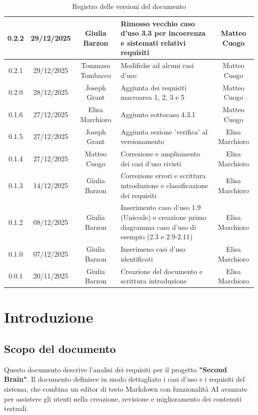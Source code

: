 \documentclass[11pt,a4paper]{article}
\begin{document}
\begin{table}[H]
\begin{tabular}{|c|c|c|>{\raggedright\arraybackslash}p{}|c|}
        \hline
        0.2.2 & 29/12/2025 & Giulia Barzon & Rimosso vecchio caso d'uso 3.3 per incoerenza e sistemati relativi requisiti & Matteo Cuogo \\
        \hline
        0.2.1 & 29/12/2025 & Tommaso Tombacco & Modifiche ad alcuni casi d'uso &  Matteo Cuogo\\ 
        \hline
        0.2.0 & 28/12/2025 & Joseph Grant & Aggiunta dei requisiti macroarea 1, 2, 3 e 5 &  Matteo Cuogo\\ 
        \hline
        0.1.6 & 27/12/2025 & Elisa Marchioro & Aggiunto sottocaso 4.3.1 & Matteo Cuogo\\ 
        \hline
        0.1.5 & 27/12/2025 & Joseph Grant & Aggiunta sezione 'verifica' al versionamento & Elisa Marchioro\\ 
        \hline
        0.1.4 & 27/12/2025 & Matteo Cuogo & Correzione e ampliamento dei casi d'uso rivisti & Elisa Marchioro\\
        \hline
        0.1.3 & 14/12/2025 & Giulia Barzon & Correzione errori e scrittura introduzione e classificazione dei requisiti & Elisa Marchioro\\
        \hline
        0.1.2 & 08/12/2025 & Giulia Barzon & Inserimento caso d'uso 1.9 (Unicode) e creazione primo diagramma caso d'uso di esempio (2.3 e 2.9-2.11) & Elisa Marchioro\\
        \hline
        0.1.0 & 07/12/2025 & Giulia Barzon & Inserimeno casi d'uso identificati & Elisa Marchioro\\
        \hline
        0.0.1 & 20/11/2025 & Giulia Barzon & Creazione del documento e scrittura introduzione & Elisa Marchioro\\
        \hline
    \end{tabular}
    \caption{Registro delle versioni del documento}
    \label{tab:versionamento}
\end{table}

\newpage

\tableofcontents
\thispagestyle{empty}
\newpage

\setcounter{page}{1}

\section{Introduzione}
\subsection{Scopo del documento}
Questo documento descrive l'analisi dei requisiti per il progetto \textbf{"Second Brain"}. Il documento definisce in modo dettagliato i casi d'uso e i requisiti del sistema, che combina un editor di testo Markdown con funzionalità AI avanzate per assistere gli utenti nella creazione, revisione e miglioramento dei contenuti testuali.
\end{document}
